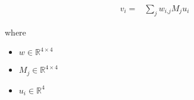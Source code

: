 \documentclass[12pt]{article}
\begin{document}
\begin{align*}
\textit{v}_{ \textit{i} } = & \sum_\textit{j} \textit{w}_{\textit{i}, \textit{j}}\textit{M}_{ \textit{j} }\textit{u}_{ \textit{i} }
\end{align*}

where
\begin{itemize}
\item $\textit{w} \in \mathbb{R}^{ 4 \times 4 }$
\item $\textit{M}_{\textit{j}} \in \mathbb{R}^{ 4 \times 4 }$
\item $\textit{u}_{\textit{i}} \in \mathbb{R}^{ 4}$
\end{itemize}
\end{document}
